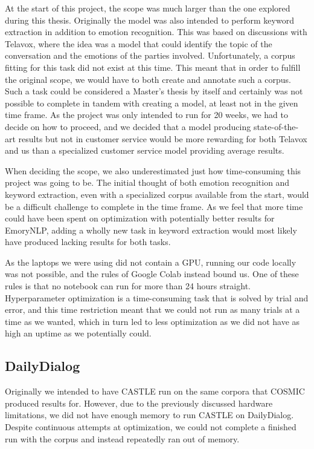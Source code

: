 \documentclass[nofilelist]{cslthse-msc}
\begin{document}
At the start of this project, the scope was much larger than the one explored during this thesis. Originally the model was also intended to perform keyword extraction in addition to emotion recognition. This was based on discussions with Telavox, where the idea was a model that could identify the topic of the conversation and the emotions of the parties involved. Unfortunately, a corpus fitting for this task did not exist at this time. This meant that in order to fulfill the original scope, we would have to both create and annotate such a corpus. Such a task could be considered a Master's thesis by itself and certainly was not possible to complete in tandem with creating a model, at least not in the given time frame. As the project was only intended to run for 20 weeks, we had to decide on how to proceed, and we decided that a model producing state-of-the-art results but not in customer service would be more rewarding for both Telavox and us than a specialized customer service model providing average results. 

When deciding the scope, we also underestimated just how time-consuming this project was going to be. The initial thought of both emotion recognition and keyword extraction, even with a specialized corpus available from the start, would be a difficult challenge to complete in the time frame. As we feel that more time could have been spent on optimization with potentially better results for EmoryNLP, adding a wholly new task in keyword extraction would most likely have produced lacking results for both tasks.

As the laptops we were using did not contain a GPU, running our code locally was not possible, and the rules of Google Colab instead bound us. One of these rules is that no notebook can run for more than 24 hours straight. Hyperparameter optimization is a time-consuming task that is solved by trial and error, and this time restriction meant that we could not run as many trials at a time as we wanted, which in turn led to less optimization as we did not have as high an uptime as we potentially could.


\subsection*{DailyDialog}
Originally we intended to have CASTLE run on the same corpora that COSMIC produced results for. However, due to the previously discussed hardware limitations, we did not have enough memory to run CASTLE on DailyDialog. Despite continuous attempts at optimization, we could not complete a finished run with the corpus and instead repeatedly ran out of memory. 
\end{document}
